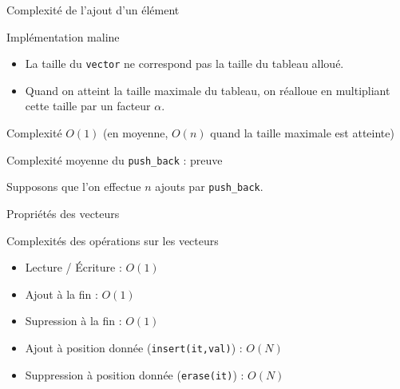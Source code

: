 \documentclass{beamer}
\begin{document}
\begin{frame}{Complexité de l'ajout d'un élément}
 \begin{block}{Implémentation maline}
 \begin{itemize}
     \item La taille du \texttt{vector} ne correspond pas la taille du tableau alloué.
    \item Quand on atteint la taille maximale du tableau, on réalloue en multipliant cette taille par un facteur $\alpha$.
 \end{itemize}
 \end{block}

 \begin{exampleblock}{Complexité}
     \centering
     $O(1)$ (en moyenne, $O(n)$ quand la taille maximale est atteinte)
 \end{exampleblock}
\end{frame}


\begin{frame}{Complexité moyenne du \texttt{push\_back} : preuve}
 
Supposons que l'on effectue $n$ ajouts par \texttt{push_back}.
 
\end{frame}

\begin{frame}{Propriétés des vecteurs}
    \begin{block}{Complexités des opérations sur les vecteurs}
  \begin{itemize}
  \item Lecture / Écriture : $O(1)$
  \item Ajout à la fin : $O(1)$
  \item Supression à la fin : $O(1)$
  \item Ajout à position donnée (\texttt{insert(it,val)}) : $O(N)$
  \item Suppression à position donnée (\texttt{erase(it)}) : $O(N)$
  \end{itemize}
\end{block}
\end{frame}
\end{document}

